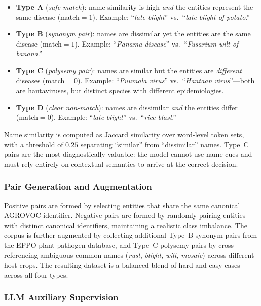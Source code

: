 \begin{itemize}
  \item \textbf{Type A} (\emph{safe match}): name similarity is high
    \emph{and} the entities represent the same disease (match$\!=\!1$).
    Example: ``\emph{late blight}'' vs.\ ``\emph{late blight of potato}.''
  \item \textbf{Type B} (\emph{synonym pair}): names are dissimilar yet
    the entities are the same disease (match$\!=\!1$).
    Example: ``\emph{Panama disease}'' vs.\ ``\emph{Fusarium wilt of banana}.''
  \item \textbf{Type C} (\emph{polysemy pair}): names are similar but the
    entities are \emph{different} diseases (match$\!=\!0$).
    Example: ``\emph{Puumala virus}'' vs.\ ``\emph{Hantaan virus}''---both
    are hantaviruses, but distinct species with different epidemiologies.
  \item \textbf{Type D} (\emph{clear non-match}): names are dissimilar
    \emph{and} the entities differ (match$\!=\!0$).
    Example: ``\emph{late blight}'' vs.\ ``\emph{rice blast}.''
\end{itemize}

Name similarity is computed as Jaccard similarity over word-level token
sets, with a threshold of $0.25$ separating ``similar'' from
``dissimilar'' names. Type~C pairs are the most diagnostically valuable:
the model cannot use name cues and must rely entirely on contextual
semantics to arrive at the correct decision.

\subsubsection{Pair Generation and Augmentation}

Positive pairs are formed by selecting entities that share the same
canonical AGROVOC identifier. Negative pairs are formed by randomly
pairing entities with distinct canonical identifiers, maintaining
a realistic class imbalance. The corpus is further augmented by
collecting additional Type~B synonym pairs from the EPPO plant pathogen
database, and Type~C polysemy pairs by cross-referencing ambiguous
common names (\emph{rust}, \emph{blight}, \emph{wilt}, \emph{mosaic})
across different host crops. The resulting dataset is a balanced blend
of hard and easy cases across all four types.

\subsubsection{LLM Auxiliary Supervision}
\label{sec:llm_super}

